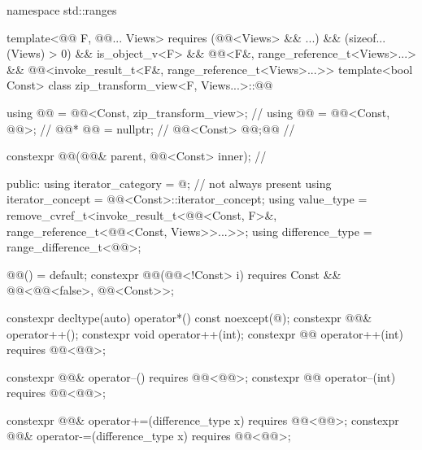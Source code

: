 %
\begin{codeblock}
namespace std::ranges {
  template<@@ F, @@... Views>
    requires (@@<Views> && ...) && (sizeof...(Views) > 0) && is_object_v<F> &&
              @@<F&, range_reference_t<Views>...> &&
              @@<invoke_result_t<F&, range_reference_t<Views>...>>
  template<bool Const>
  class zip_transform_view<F, Views...>::@@ {
    using @@ = @@<Const, zip_transform_view>;      // \expos
    using @@ = @@<Const, @@>;                 // \expos
    @@* @@ = nullptr;                                  // \expos
    @@<Const> @@;@\itcorr[-1]@                                    // \expos

    constexpr @@(@@& parent, @@<Const> inner);   // \expos

  public:
    using iterator_category = @\seebelownc@;                        // not always present
    using iterator_concept  = @@<Const>::iterator_concept;
    using value_type =
      remove_cvref_t<invoke_result_t<@@<Const, F>&,
                                     range_reference_t<@@<Const, Views>>...>>;
    using difference_type = range_difference_t<@@>;

    @@() = default;
    constexpr @@(@@<!Const> i)
      requires Const && @@<@@<false>, @@<Const>>;

    constexpr decltype(auto) operator*() const noexcept(@\seebelow@);
    constexpr @@& operator++();
    constexpr void operator++(int);
    constexpr @@ operator++(int) requires @@<@@>;

    constexpr @@& operator--() requires @@<@@>;
    constexpr @@ operator--(int) requires @@<@@>;

    constexpr @@& operator+=(difference_type x) requires @@<@@>;
    constexpr @@& operator-=(difference_type x) requires @@<@@>;

}}
\end{codeblock}
